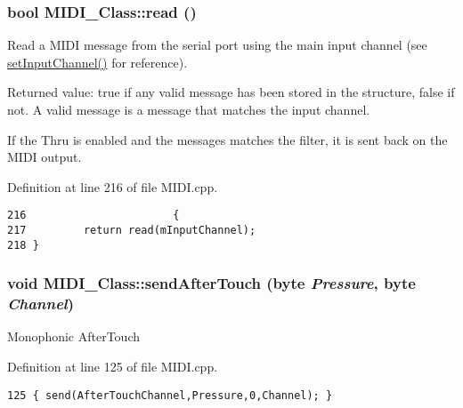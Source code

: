 \hypertarget{class_m_i_d_i___class_8e7be5af3a32cb91f596dbb8d8c297bf}{
\subsubsection[{read}]{\setlength{\rightskip}{0pt plus 5cm}bool MIDI\_\-Class::read ()}}
\label{class_m_i_d_i___class_8e7be5af3a32cb91f596dbb8d8c297bf}


Read a MIDI message from the serial port using the main input channel (see \hyperlink{class_m_i_d_i___class_35a66d47ba598c7ebbee7fbf654dafe8}{setInputChannel()} for reference). \par
 Returned value: true if any valid message has been stored in the structure, false if not. A valid message is a message that matches the input channel. \par
\par
 If the Thru is enabled and the messages matches the filter, it is sent back on the MIDI output. 

Definition at line 216 of file MIDI.cpp.

\begin{Code}\begin{verbatim}216                       {
217         return read(mInputChannel);
218 }
\end{verbatim}
\end{Code}


\hypertarget{class_m_i_d_i___class_73b57f656a80166b98dc1b57ea9a56dc}{
\subsubsection[{sendAfterTouch}]{\setlength{\rightskip}{0pt plus 5cm}void MIDI\_\-Class::sendAfterTouch (byte {\em Pressure}, \/  byte {\em Channel})}}
\label{class_m_i_d_i___class_73b57f656a80166b98dc1b57ea9a56dc}


Monophonic AfterTouch 

Definition at line 125 of file MIDI.cpp.

\begin{Code}\begin{verbatim}125 { send(AfterTouchChannel,Pressure,0,Channel); }
\end{verbatim}
\end{Code}


